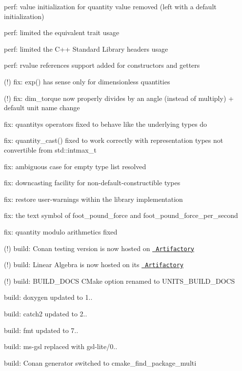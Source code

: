 \begin{DoxyItemize}
\begin{DoxyItemize}
\item perf\+: value initialization for quantity value removed (left with a default initialization)
\item perf\+: limited the {\ttfamily equivalent} trait usage
\item perf\+: limited the C++ Standard Library headers usage
\item perf\+: rvalue references support added for constructors and getters
\item (!) fix\+: {\ttfamily exp()} has sense only for dimensionless quantities
\item (!) fix\+: {\ttfamily dim\+\_\+torque} now properly divides by an angle (instead of multiply) + default unit name change
\item fix\+: quantity\textquotesingle{}s operators fixed to behave like the underlying types do
\item fix\+: {\ttfamily quantity\+\_\+cast()} fixed to work correctly with representation types not convertible from {\ttfamily std\+::intmax\+\_\+t}
\item fix\+: ambiguous case for empty type list resolved
\item fix\+: downcasting facility for non-\/default-\/constructible types
\item fix\+: restore user-\/warnings within the library implementation
\item fix\+: the text symbol of {\ttfamily foot\+\_\+pound\+\_\+force} and {\ttfamily foot\+\_\+pound\+\_\+force\+\_\+per\+\_\+second}
\item fix\+: quantity modulo arithmetics fixed
\item (!) build\+: Conan testing version is now hosted on \href{https://mpusz.jfrog.io/ui/packages/conan:\%2F\%2Fmp-units}{\texttt{ Artifactory}}
\item (!) build\+: Linear Algebra is now hosted on its \href{https://twonington.jfrog.io/artifactory/api/conan/conan-oss}{\texttt{ Artifactory}}
\item (!) build\+: {\ttfamily BUILD\+\_\+\+DOCS} CMake option renamed to {\ttfamily UNITS\+\_\+\+BUILD\+\_\+\+DOCS}
\item build\+: doxygen updated to 1..
\item build\+: catch2 updated to 2..
\item build\+: fmt updated to 7..
\item build\+: ms-\/gsl replaced with gsl-\/lite/0..
\item build\+: Conan generator switched to {\ttfamily cmake\+\_\+find\+\_\+package\+\_\+multi}

\end{DoxyItemize}
\end{DoxyItemize}
